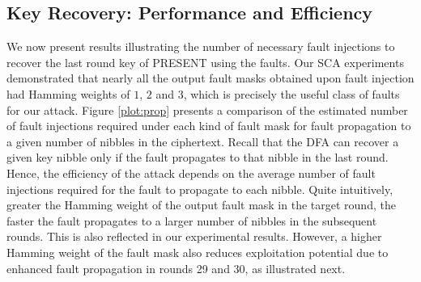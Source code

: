 \documentclass[10pt, conference, compsocconf]{IEEEtran}  %
\numberwithin{Definition}{section}
\numberwithin{Claim}{section}
\begin{document}
\subsection{Key Recovery: Performance and Efficiency}

We now present results illustrating the number of necessary fault injections to recover the last round key of PRESENT using the faults. Our SCA experiments demonstrated that nearly all the output fault masks obtained upon fault injection had Hamming weights of $1$, $2$ and $3$, which is precisely the useful class of faults for our attack. Figure \ref{plot:prop} presents a comparison of the estimated number of fault injections required under each kind of fault mask for fault propagation to a given number of nibbles in the ciphertext. Recall that the DFA can recover a given key nibble only if the fault propagates to that nibble in the last round. Hence, the efficiency of the attack depends on the average number of fault injections required for the fault to propagate to each nibble. Quite intuitively, greater the Hamming weight of the output fault mask in the target round, the faster the fault propagates to a larger number of nibbles in the subsequent rounds. This is also reflected in our experimental results. However, a higher Hamming weight of the fault mask also reduces exploitation potential due to enhanced fault propagation in rounds 29 and 30, as illustrated next.
\end{document}
